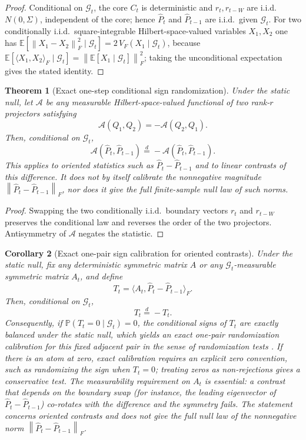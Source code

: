 \documentclass[11pt]{article}
\theoremstyle{tightplain}
\newtheorem{theorem}{Theorem}[section]
\newtheorem{corollary}[theorem]{Corollary}
\theoremstyle{tightdef}
\newcommand{\E}{\mathbb E}
\newcommand{\Prob}{\mathbb P}
\newcommand{\norm}[1]{\left\lVert #1 \right\rVert}
\begin{document}
\begin{proof}
Conditional on $\mathcal G_t$, the core $C_t$ is deterministic and
$r_t,r_{t-W}$ are i.i.d.\ $N(0,\Sigma)$, independent of the core; hence
$\widehat P_t$ and $\widehat P_{t-1}$ are i.i.d.\ given $\mathcal G_t$. For two
conditionally i.i.d.\ square-integrable Hilbert-space-valued variables
$X_1,X_2$ one has
$\E[\norm{X_1-X_2}_F^2\mid\mathcal G_t]=2\,V_F(X_1\mid\mathcal G_t)$, because
$\E[\langle X_1,X_2\rangle_F\mid\mathcal G_t]=\norm{\E[X_1\mid\mathcal G_t]}_F^2$;
taking the unconditional expectation gives the stated identity.
\end{proof}

\begin{theorem}[Exact one-step conditional sign randomization]\label{thm:exactrandomization}
Under the static null, let $\mathcal A$ be any measurable Hilbert-space-valued
functional of two rank-$r$ projectors satisfying
\[
\mathcal A(Q_1,Q_2)=-\mathcal A(Q_2,Q_1).
\]
Then, conditional on $\mathcal G_t$,
\[
\mathcal A(\widehat P_t,\widehat P_{t-1})
\stackrel{d}=
-\mathcal A(\widehat P_t,\widehat P_{t-1}).
\]
This applies to oriented statistics such as $\widehat P_t-\widehat P_{t-1}$ and
to linear contrasts of this difference. It does not by itself calibrate the
nonnegative magnitude $\norm{\widehat P_t-\widehat P_{t-1}}_F$, nor does it give
the full finite-sample null law of such norms.
\end{theorem}

\begin{proof}
Swapping the two conditionally i.i.d.\ boundary vectors $r_t$ and $r_{t-W}$
preserves the conditional law and reverses the order of the two projectors.
Antisymmetry of $\mathcal A$ negates the statistic.
\end{proof}

\begin{corollary}[Exact one-pair sign calibration for oriented contrasts]\label{cor:signtest}
Under the static null, fix any deterministic symmetric matrix $A$ or any
$\mathcal G_t$-measurable symmetric matrix $A_t$, and define
\[
T_t=\langle A_t,\widehat P_t-\widehat P_{t-1}\rangle_F.
\]
Then, conditional on $\mathcal G_t$,
\[
T_t\stackrel d=-T_t.
\]
Consequently, if $\Prob(T_t=0\mid\mathcal G_t)=0$, the conditional signs of
$T_t$ are exactly balanced under the static null, which yields an exact
one-pair randomization calibration for this fixed adjacent pair in the sense of
randomization tests \cite[Ch.~15]{LehmannRomano2005}. If there is an atom at zero, exact
calibration requires an explicit zero convention, such as randomizing the sign
when $T_t=0$; treating zeros as non-rejections gives a conservative test. The
measurability requirement on $A_t$ is essential: a contrast that depends on the
boundary swap (for instance, the leading eigenvector of
$\widehat P_t-\widehat P_{t-1}$) co-rotates with the difference and the symmetry
fails. The statement concerns oriented contrasts and does not give the full
null law of the nonnegative norm $\norm{\widehat P_t-\widehat P_{t-1}}_F$.
\end{corollary}
\end{document}
